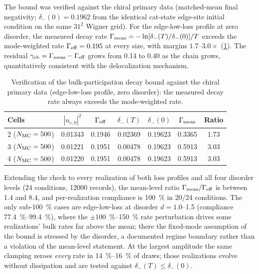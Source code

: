 \documentclass[aps,pra,preprint,superscriptaddress,amsmath,amssymb]{revtex4-2}
\begin{document}
The bound was verified against the chiral primary data (matched-mean final negativity; $\delta_-(0)=\num{0.1962}$ from the identical cat-state edge-site initial condition on the same $\num{31}^2$ Wigner grid). For the edge-low-loss profile at zero disorder, the measured decay rate $\Gamma_{\rm meas}=-\ln[\delta_-(T)/\delta_-(0)]/T$ exceeds the mode-weighted rate $\Gamma_{\rm eff}=\num{0.195}$ at every size, with margins $\num{1.7}$--$\num{3.0}\times$ (\cref{tab:bound-verification}). The residual $\gamma_{\rm eb}=\Gamma_{\rm meas}-\Gamma_{\rm eff}$ grows from \num{0.14} to \num{0.40} as the chain grows, quantitatively consistent with the delocalization mechanism.

\begin{table}[t]
\caption{Verification of the bulk-participation decay bound against the chiral primary data (edge-low-loss profile, zero disorder): the measured decay rate always exceeds the mode-weighted rate.}
\label{tab:bound-verification}
\begin{tabular}{lcccccc}
\hline
Cells & $|u_{e,0}|^2$ & $\Gamma_{\rm eff}$ & $\delta_-(T)$ & $\delta_-(0)$ & $\Gamma_{\rm meas}$ & Ratio \\
\hline
\num{2} ($N_{\rm MC}=\num{500}$) & \num{0.01343} & \num{0.1946} & \num{0.02369} & \num{0.19623} & \num{0.3365} & \num{1.73} \\
\num{3} ($N_{\rm MC}=\num{500}$) & \num{0.01221} & \num{0.1951} & \num{0.00478} & \num{0.19623} & \num{0.5913} & \num{3.03} \\
\num{4} ($N_{\rm MC}=\num{500}$) & \num{0.01220} & \num{0.1951} & \num{0.00478} & \num{0.19623} & \num{0.5913} & \num{3.03} \\
\hline
\end{tabular}
\end{table}

Extending the check to every realization of both loss profiles and all four disorder levels ($\num{24}$ conditions, \num{12000} records), the mean-level ratio $\Gamma_{\rm meas}/\Gamma_{\rm eff}$ is between \num{1.4} and \num{8.4}, and per-realization compliance is \qty{100}{\percent} in \num{20}/\num{24} conditions. The only sub-\qty{100}{\percent} cases are edge-low-loss at disorder $d=\num{1.0}$--\num{1.5} (compliance \qty{77.4}{\percent}--\qty{99.4}{\percent}), where the $\pm$\qty{100}{\percent}--\qty{150}{\percent} rate perturbation drives some realizations' bulk rates far above the mean; there the fixed-mode assumption of the bound is stressed by the disorder, a documented regime boundary rather than a violation of the mean-level statement. At the largest amplitude the same clamping zeroes \emph{every} rate in \qty{14}{\percent}--\qty{16}{\percent} of draws; those realizations evolve without dissipation and are tested against $\delta_-(T)\le\delta_-(0)$.
\end{document}

